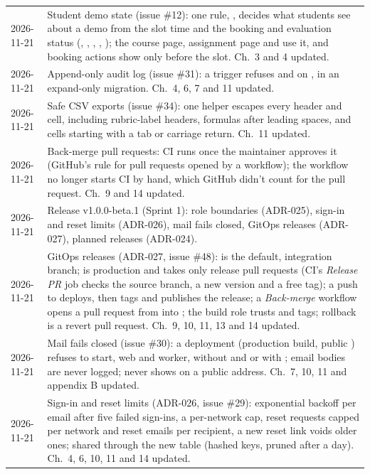 \begin{xltabular}{\linewidth}{@{}l L@{}}
  2026-11-21 & Student demo state (issue \#12): one rule, , decides what students see about a demo from the slot time and the booking and evaluation status (, , , , ); the course page, assignment page and  use it, and booking actions show only before the slot. Ch.~3 and 4 updated.\\
  2026-11-21 & Append-only audit log (issue \#31): a trigger refuses  and  on , in an expand-only migration. Ch.~4, 6, 7 and 11 updated.\\
  2026-11-21 & Safe CSV exports (issue \#34): one  helper escapes every header and cell, including rubric-label headers, formulas after leading spaces, and cells starting with a tab or carriage return. Ch.~11 updated.\\
  2026-11-21 & Back-merge pull requests: CI runs once the maintainer approves it (GitHub's rule for pull requests opened by a workflow); the workflow no longer starts CI by hand, which GitHub didn't count for the pull request. Ch.~9 and 14 updated.\\
  2026-11-21 & Release v1.0.0-beta.1 (Sprint 1): role boundaries (ADR-025), sign-in and reset limits (ADR-026), mail fails closed, GitOps releases (ADR-027), planned releases (ADR-024).\\
  2026-11-21 & GitOps releases (ADR-027, issue \#48):  is the default, integration branch;  is production and takes only release pull requests (CI's \emph{Release PR} job checks the source branch, a new version and a free tag); a push to  deploys, then tags and publishes the release; a \emph{Back-merge} workflow opens a pull request from  into ; the build role trusts  and  tags; rollback is a revert pull request. Ch.~9, 10, 11, 13 and 14 updated.\\
  2026-11-21 & Mail fails closed (issue \#30): a deployment (production build, public ) refuses to start, web and worker, without  and  or with ; email bodies are never logged;  never shows on a public address. Ch.~7, 10, 11 and appendix B updated.\\
  2026-11-21 & Sign-in and reset limits (ADR-026, issue \#29): exponential backoff per email after five failed sign-ins, a per-network cap, reset requests capped per network and reset emails per recipient, a new reset link voids older ones; shared through the new  table (hashed keys, pruned after a day). Ch.~4, 6, 10, 11 and 14 updated.\\

\end{xltabular}

